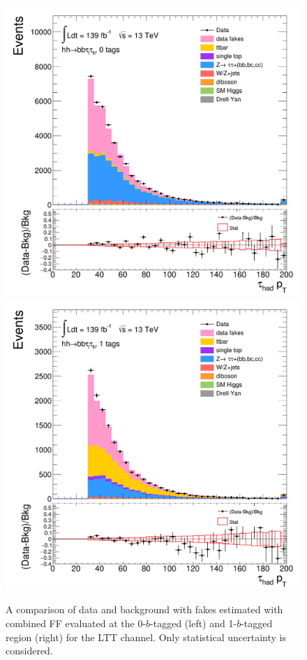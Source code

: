 \begin{figure}[htbp]
\centering
\includegraphics[width=.4\textwidth]{DiHiggs/plots/FF_CRs/SR_LTT_datafakes/HNone/BDTVarsHighMbb/0/C_0tag2pjet_0ptv_TauPt.png}
\includegraphics[width=.4\textwidth]{DiHiggs/plots/FF_CRs/SR_LTT_datafakes/HNone/BDTVarsHighMbb/1/C_1tag2pjet_0ptv_TauPt.png} \\
\caption{A comparison of data and background with fakes estimated with combined FF evaluated at the 0-$b$-tagged (left) 
and 1-$b$-tagged region (right) for the LTT channel.
Only statistical uncertainty is considered.  }
\label{fig:FFVRLTT}
\end{figure}









